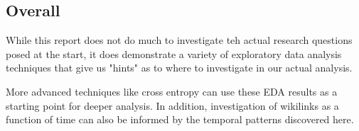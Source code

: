\documentclass[11pt]{article}
\begin{document}
\subsection{Overall}

While this report does not do much to investigate teh actual research questions posed at the start, it does demonstrate a variety of exploratory data analysis techniques that give us "hints" as to where to investigate in our actual analysis.

More advanced techniques like cross entropy can use these EDA results as a starting point for deeper analysis. In addition, investigation of wikilinks as a function of time can also be informed by the temporal patterns discovered here.
\end{document}
